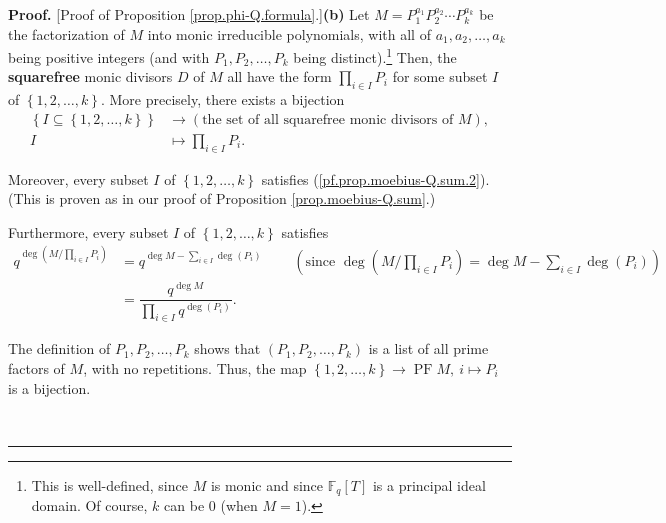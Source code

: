 \documentclass[numbers=enddot,12pt,final,onecolumn,notitlepage]{scrartcl}%
\theoremstyle{definition}
\newenvironment{proof}[1][Proof]{\noindent\textbf{#1.} }{\ \rule{0.5em}{0.5em}}
\let\sumnonlimits\sum
\let\prodnonlimits\prod
\renewcommand{\sum}{\sumnonlimits\limits}
\renewcommand{\prod}{\prodnonlimits\limits}
\begin{document}
\begin{proof}
[Proof of Proposition \ref{prop.phi-Q.formula}.]\textbf{(b)} Let
$M=P_{1}^{a_{1}}P_{2}^{a_{2}}\cdots P_{k}^{a_{k}}$ be the factorization of $M$
into monic irreducible polynomials, with all of $a_{1},a_{2},\ldots,a_{k}$
being positive integers (and with $P_{1},P_{2},\ldots,P_{k}$ being
distinct).\footnote{This is well-defined, since $M$ is monic and since
$\mathbb{F}_{q}\left[  T\right]  $ is a principal ideal domain. Of course, $k$
can be $0$ (when $M=1$).} Then, the \textbf{squarefree} monic divisors $D$ of
$M$ all have the form $\prod_{i\in I}P_{i}$ for some subset $I$ of $\left\{
1,2,\ldots,k\right\}  $. More precisely, there exists a bijection%
\begin{align}
\left\{  I\subseteq\left\{  1,2,\ldots,k\right\}  \right\}   &  \rightarrow
\left(  \text{the set of all squarefree monic divisors of }M\right)
,\nonumber\\
I  &  \mapsto\prod_{i\in I}P_{i}. \label{pf.prop.phi-Q.formula.b.bij}%
\end{align}


Moreover, every subset $I$ of $\left\{  1,2,\ldots,k\right\}  $ satisfies
(\ref{pf.prop.moebius-Q.sum.2}). (This is proven as in our proof of
Proposition \ref{prop.moebius-Q.sum}.)

Furthermore, every subset $I$ of $\left\{  1,2,\ldots,k\right\}  $ satisfies%
\begin{align}
q^{\deg\left(  M/\prod_{i\in I}P_{i}\right)  }  &  =q^{\deg M-\sum_{i\in
I}\deg\left(  P_{i}\right)  }\ \ \ \ \ \ \ \ \ \ \left(  \text{since }%
\deg\left(  M/\prod_{i\in I}P_{i}\right)  =\deg M-\sum_{i\in I}\deg\left(
P_{i}\right)  \right) \nonumber\\
&  =\dfrac{q^{\deg M}}{\prod_{i\in I}q^{\deg\left(  P_{i}\right)  }}.
\label{pf.prop.phi-Q.formula.b.qdeg}%
\end{align}


The definition of $P_{1},P_{2},\ldots,P_{k}$ shows that $\left(  P_{1}%
,P_{2},\ldots,P_{k}\right)  $ is a list of all prime factors of $M$, with no
repetitions. Thus, the map $\left\{  1,2,\ldots,k\right\}  \rightarrow
\operatorname*{PF}M,\ i\mapsto P_{i}$ is a bijection.


\end{proof}
\end{document}
